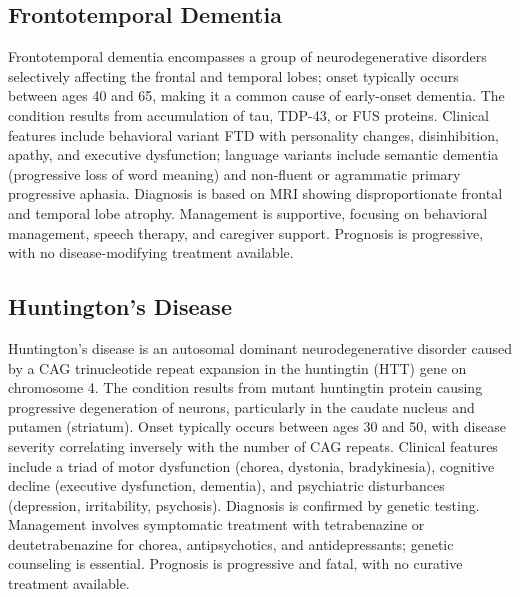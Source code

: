 \subsection{Frontotemporal Dementia}
\label{sec:Frontotemporal Dementia}
Frontotemporal dementia encompasses a group of neurodegenerative disorders selectively affecting the frontal and temporal lobes; onset typically occurs between ages 40 and 65, making it a common cause of early-onset dementia. The condition results from accumulation of tau, TDP-43, or FUS proteins. Clinical features include behavioral variant FTD with personality changes, disinhibition, apathy, and executive dysfunction; language variants include semantic dementia (progressive loss of word meaning) and non-fluent or agrammatic primary progressive aphasia. Diagnosis is based on MRI showing disproportionate frontal and temporal lobe atrophy. Management is supportive, focusing on behavioral management, speech therapy, and caregiver support. Prognosis is progressive, with no disease-modifying treatment available.

\subsection{Huntington's Disease}
\label{sec:Huntington's Disease}
Huntington's disease is an autosomal dominant neurodegenerative disorder caused by a CAG trinucleotide repeat expansion in the huntingtin (HTT) gene on chromosome 4. The condition results from mutant huntingtin protein causing progressive degeneration of neurons, particularly in the caudate nucleus and putamen (striatum). Onset typically occurs between ages 30 and 50, with disease severity correlating inversely with the number of CAG repeats. Clinical features include a triad of motor dysfunction (chorea, dystonia, bradykinesia), cognitive decline (executive dysfunction, dementia), and psychiatric disturbances (depression, irritability, psychosis). Diagnosis is confirmed by genetic testing. Management involves symptomatic treatment with tetrabenazine or deutetrabenazine for chorea, antipsychotics, and antidepressants; genetic counseling is essential. Prognosis is progressive and fatal, with no curative treatment available.

